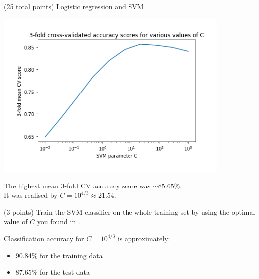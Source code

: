 \documentclass[12pt]{article}
\begin{document}
\begin{question}{(25 total points) Logistic regression and SVM}
\begin{subquestion}
   

      \begin{answerbox}{30em}
           \begin{center}
	\includegraphics[width=0.85\textwidth]{imgs/2_5.png}
	\end{center}
	The highest mean 3-fold CV accuracy score was $\sim 85.65\%$. \\
	It was realised by $C=10^{4/3} \approx 21.54$.
      \end{answerbox}
  


   \end{subquestion}
   \begin{subquestion}{(3 points)
       Train the SVM classifier on the whole training set by using the
       optimal value of $C$ you found in . 
     } \label{Q2.6}


       

      \begin{answerbox}{10em}
         Classification accuracy for $C=10^{4/3}$ is approximately:
         \begin{itemize}
        	\itemsep -3pt {}
        	\item 90.84\% for the training data
        	\item 87.65\% for the test data
         
		\end{itemize}          
      \end{answerbox}
  


   \end{subquestion}
%
%

\end{question}
\clearpage
%
%
\end{document}
